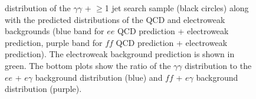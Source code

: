 \documentclass[dissertation.tex]{subfiles}
\begin{document}
\begin{figure}
	\caption{\MET distribution of the $\gamma\gamma$ + $\geq$1 jet search sample (black circles) along with the predicted \MET distributions of the QCD and electroweak backgrounds (blue band for $ee$ QCD prediction + electroweak prediction, purple band for $\mathit{ff}$ QCD prediction + electroweak prediction).  The electroweak background prediction is shown in green.  The bottom plots show the ratio of the $\gamma\gamma$ \MET distribution to the $ee$ + $e\gamma$ background distribution (blue) and $\mathit{ff}$ + $e\gamma$ background distribution (purple).}
	\label{fig:MET_final_geq1j}
\end{figure}
\end{document}
